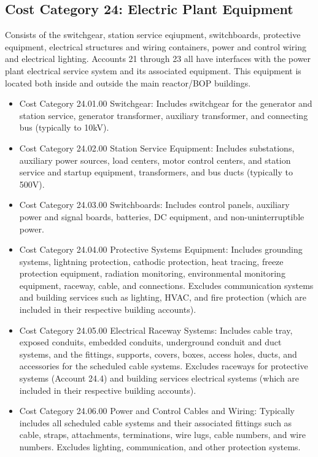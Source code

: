 
\subsection{Cost Category 24: Electric Plant Equipment}

Consists of the switchgear, station service eqiupment, switchboards, protective equipment, electrical structures and wiring containers, power and control wiring and electrical lighting.  Accounts 21 through 23 all have interfaces with the power plant electrical service system and its associated equipment. This equipment is located both inside and outside the main reactor/BOP buildings.

\begin{itemize}

\item Cost Category 24.01.00 Switchgear: Includes switchgear for the generator and station service, generator transformer, auxiliary transformer, and connecting bus (typically to 10kV).

\item  Cost Category 24.02.00 Station Service Equipment: Includes substations, auxiliary power sources, load centers, motor control centers, and station service and startup equipment, transformers, and bus ducts (typically to 500V).

\item  Cost Category 24.03.00 Switchboards: Includes control panels, auxiliary power and signal boards, batteries, DC equipment, and non-uninterruptible power.

\item  Cost Category 24.04.00 Protective Systems Equipment: Includes grounding systems, lightning protection, cathodic protection, heat tracing, freeze protection equipment, radiation monitoring, environmental monitoring equipment, raceway, cable, and connections. Excludes communication systems and building services such as lighting, HVAC, and fire protection (which are included in their respective building accounts).

\item  Cost Category 24.05.00 Electrical Raceway Systems: Includes cable tray, exposed conduits, embedded conduits, underground conduit and duct systems, and the fittings, supports, covers, boxes, access holes, ducts, and accessories for the scheduled cable systems. Excludes raceways for protective systems (Account 24.4) and building services electrical systems (which are included in their respective building
accounts).

\item  Cost Category 24.06.00 Power and Control Cables and Wiring: Typically includes all scheduled cable systems and their associated fittings such as cable, straps, attachments, terminations, wire lugs, cable numbers, and wire numbers. Excludes lighting, communication, and other protection systems.

\end{itemize}

